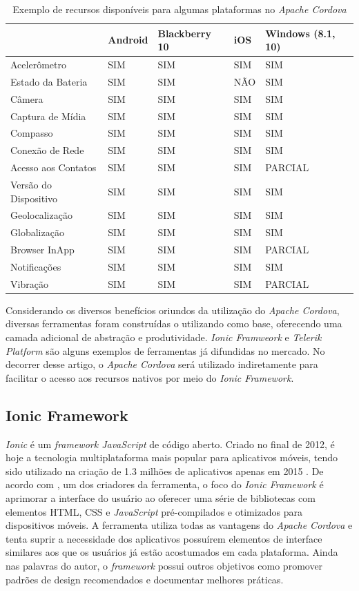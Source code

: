 \begin{table}[]
	\centering
	\caption{Exemplo de recursos disponíveis para algumas plataformas no \textit{Apache Cordova}}
	\label{Meu label}
	\begin{tabular}{|l|l|l|l|l|}
		\hline
	 & Android & Blackberry 10 & iOS  & Windows (8.1, 10) \\ \hline
	Acelerômetro & SIM & SIM & SIM  & SIM \\ \hline
	Estado da Bateria & SIM & SIM &  NÃO  & SIM \\ \hline
	Câmera & SIM & SIM & SIM & SIM \\ \hline
	Captura de Mídia & SIM & SIM & SIM  & SIM \\ \hline
	Compasso & SIM & SIM & SIM  & SIM \\ \hline
	Conexão de Rede & SIM & SIM & SIM & SIM \\ \hline
	Acesso aos Contatos & SIM & SIM & SIM  & PARCIAL \\ \hline
	Versão do Dispositivo & SIM & SIM & SIM  & SIM \\ \hline
	Geolocalização & SIM & SIM & SIM & SIM \\ \hline
	Globalização & SIM & SIM & SIM  & SIM \\ \hline
	Browser InApp & SIM & SIM & SIM & PARCIAL \\ \hline
	Notificações & SIM & SIM & SIM & SIM \\ \hline
	Vibração & SIM & SIM & SIM & PARCIAL \\ \hline
	\end{tabular}
\end{table}

Considerando os diversos benefícios oriundos da utilização do \textit{Apache Cordova}, diversas ferramentas foram construídas o utilizando como base, oferecendo uma camada adicional de abstração e produtividade. \textit{Ionic Framweork} e \textit{Telerik Platform} são alguns exemplos de ferramentas já difundidas no mercado. No decorrer desse artigo, o \textit{Apache Cordova} será utilizado indiretamente para facilitar o acesso aos recursos nativos por meio do \textit{Ionic Framework}.
\subsection{\esp Ionic Framework}

\textit{Ionic} é um \textit{framework JavaScript} de código aberto. Criado no final de 2012, é hoje a tecnologia multiplataforma mais popular para aplicativos móveis, tendo sido utilizado na criação de 1.3 milhões de aplicativos apenas em 2015 \cite{ionic2015}. De acordo com \cite{ionicFIT}, um dos criadores da ferramenta, o foco do \textit{ Ionic Framework} é aprimorar a interface do usuário ao oferecer uma série de bibliotecas com elementos HTML, CSS e \textit{JavaScript} pré-compilados e otimizados para dispositivos móveis. A ferramenta utiliza todas as vantagens do \textit{Apache Cordova} e tenta suprir a necessidade dos aplicativos possuírem elementos de interface similares aos que os usuários já estão acostumados em cada plataforma. Ainda nas palavras do autor, o \textit{framework} possui outros objetivos como promover padrões de design recomendados e documentar melhores práticas.

